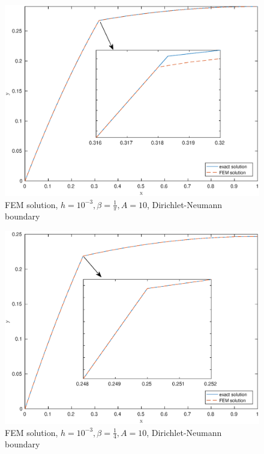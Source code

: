 \documentclass[12pt]{article}
\begin{document}
\begin{figure}[h!]
\centering
\includegraphics[scale=0.6]{FEM-pi-DN}
\caption{FEM solution, $h=10^{-3},\beta=\frac{1}{\pi},A=10$, Dirichlet-Neumann boundary}
\end{figure}
\pagebreak
\begin{figure}[h!]
\centering
\includegraphics[scale=0.6]{FEM-4-DN}
\caption{FEM solution, $h=10^{-3},\beta=\frac{1}{4},A=10$, Dirichlet-Neumann boundary}
\end{figure}
\end{document}
